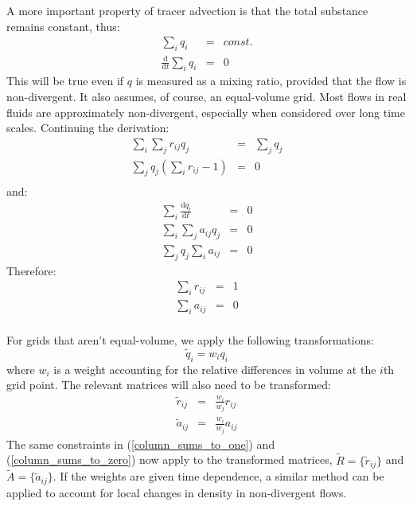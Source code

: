 \documentclass[11pt]{article}
\begin{document}
A more important property of tracer advection is that the total substance
remains constant, thus:
\begin{eqnarray}
\sum_i q_i & = & const. \\
\frac{\mathrm d}{\mathrm d t}\sum_i q_i & = & 0
\end{eqnarray}
This will be true even if $q$ is measured as a mixing ratio, provided that
the flow is non-divergent.  
It also assumes, of course, an equal-volume grid.
Most flows in real fluids are approximately 
non-divergent, especially when considered over long time scales.
Continuing the derivation:
\begin{eqnarray}
\sum_i \sum_j r_{ij} q_j & = & \sum_j q_j \\
\sum_j q_j \left ( \sum_i r_{ij} - 1 \right ) & = & 0 \\
\end{eqnarray}
and:
\begin{eqnarray}
\sum_i \frac{\mathrm d q_i}{\mathrm d t} & = & 0 \\
\sum_i \sum_j a_{ij} q_j & = & 0 \\
\sum_j q_j \sum_i a_{ij} & = & 0 
\end{eqnarray}
Therefore:
\begin{eqnarray}
\sum_i r_{ij} & = & 1 
\label{column_sums_to_one}\\
\sum_i a_{ij} & = & 0
\label{column_sums_to_zero}\\
\end{eqnarray}

For grids that aren't equal-volume, we apply the following transformations:
\begin{equation}
  \tilde q_i = w_i q_i
\end{equation}
where $w_i$ is a weight accounting for the relative differences 
in volume at the $i$th grid point.
The relevant matrices will also need to be transformed:
\begin{eqnarray}
  \tilde r_{ij} & = & \frac{w_i}{w_j} r_{ij} \\
  \tilde a_{ij} & = & \frac{w_i}{w_j} a_{ij}
\end{eqnarray}
The same constraints in 
(\ref{column_sums_to_one}) and (\ref{column_sums_to_zero}) 
now apply to the transformed matrices, $\tilde R=\lbrace \tilde r_{ij} \rbrace$
and $\tilde A=\lbrace \tilde a_{ij} \rbrace$.
If the weights are given time dependence, a similar method can be
applied to account for local changes in density in non-divergent flows.
\end{document}
